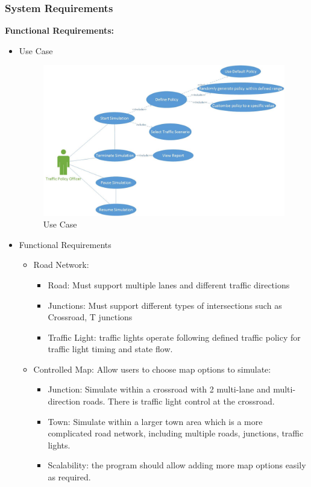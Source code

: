 \documentclass[11pt]{article}
\begin{document}
{\subsubsection{System Requirements}

    {\bf{Functional Requirements:}} \newline
    \begin{itemize}
        \item Use Case
        \begin{figure}[h]
        \includegraphics[width=16cm]{usecase} 
        \caption{Use Case} 
        \label{uc}
        \end{figure}
        \item Functional Requirements 
        \begin{itemize}
            \item Road Network:
                \begin{itemize}
                    \item Road: Must support multiple lanes and different traffic directions 
                    \item Junctions: Must support different types of intersections such as Crossroad, T junctions 
                    \item Traffic Light: traffic lights operate following  defined traffic policy for traffic light timing and state flow.
                    
                    
                    
                \end{itemize}
            \item Controlled Map: Allow users to choose map options to simulate:
                 \begin{itemize}[noitemsep]
	                    \item Junction: Simulate within a crossroad with 2 multi-lane and multi-direction roads. There is traffic light control at the crossroad.
	                    \item Town: Simulate within a larger town area which is a more complicated road network, including multiple roads, junctions, traffic lights. 
	                    \item Scalability: the program should allow adding more map options easily as required. 
                    	

\end{itemize}
\end{itemize}
\end{itemize}}
\end{document}
